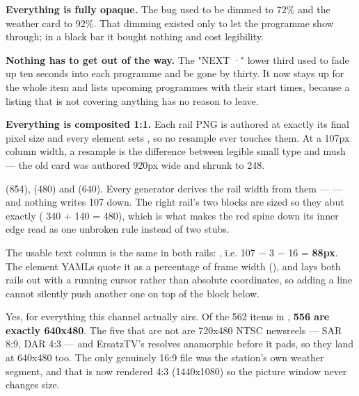 \documentclass[fontpath=fonts/,logopath=logo/]{riposte-doc}
\begin{document}
\begin{ripbullets}
\item \textbf{Everything is fully opaque.} The bug used to be dimmed to 72\% and the weather card to 92\%. That dimming existed only to let the programme show through; in a black bar it bought nothing and cost legibility.
\item \textbf{Nothing has to get out of the way.} The "NEXT ·" lower third used to fade up ten seconds into each programme and be gone by thirty. It now stays up for the whole item and lists  upcoming programmes with their start times, because a listing that is not covering anything has no reason to leave.
\item \textbf{Everything is composited 1:1.} Each rail PNG is authored at exactly its final pixel size and every element sets , so no resample ever touches them. At a 107px column width, a resample is the difference between legible small type and mush — the old card was authored 920px wide and shrunk to 248.
\end{ripbullets}



 (854),  (480) and  (640). Every generator derives the rail width from them —  — and nothing writes 107 down. The right rail's two blocks are sized so they abut exactly ( 340 +  140 = 480), which is what makes the red spine down its inner edge read as one unbroken rule instead of two stubs.

The usable text column is the same in both rails: , i.e. 107 − 3 − 16 = \textbf{88px}. The element YAMLs quote it as a percentage of frame width (), and  lays both rails out with a running cursor rather than absolute coordinates, so adding a line cannot silently push another one on top of the block below.



Yes, for everything this channel actually airs. Of the 562 items in , \textbf{556 are exactly 640x480}. The five that are not are 720x480 NTSC newsreels — SAR 8:9, DAR 4:3 — and ErsatzTV's  resolves anamorphic before it pads, so they land at 640x480 too. The only genuinely 16:9 file was the station's own weather segment, and that is now rendered 4:3 (1440x1080) so the picture window never changes size.
\end{document}
